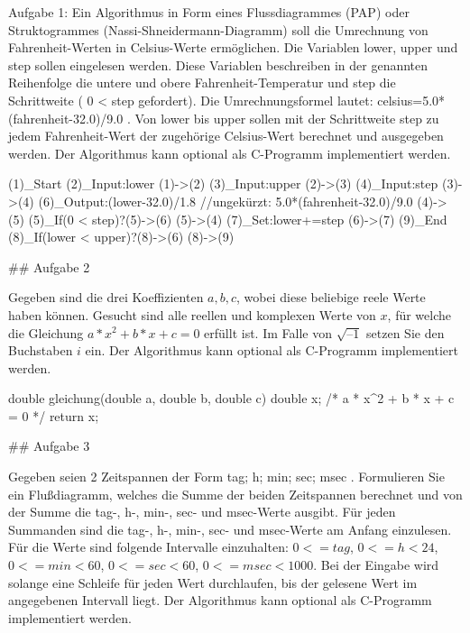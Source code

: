 Aufgabe 1: Ein Algorithmus in Form eines Flussdiagrammes (PAP) oder Struktogrammes (Nassi-Shneidermann-Diagramm) soll die Umrechnung von Fahrenheit-Werten in Celsius-Werte ermöglichen. Die Variablen lower, upper und step sollen eingelesen werden. Diese Variablen beschreiben in der genannten Reihenfolge die untere und obere Fahrenheit-Temperatur und step die Schrittweite ( 0 < step gefordert). Die Umrechnungsformel lautet: celsius=5.0*(fahrenheit-32.0)/9.0 .
Von lower bis upper sollen mit der Schrittweite step zu jedem Fahrenheit-Wert der zugehörige Celsius-Wert berechnet und ausgegeben werden. Der Algorithmus kann optional als C-Programm implementiert werden.

    (1)_Start
    (2)_Input:lower 
    (1)->(2)
    (3)_Input:upper
    (2)->(3)
    (4)_Input:step 
    (3)->(4)
    (6)_Output:(lower-32.0)/1.8  //ungekürzt: 5.0*(fahrenheit-32.0)/9.0
    (4)->(5)
    (5)_If(0 < step)?(5)->(6)
    (5)->(4)
    (7)_Set:lower+=step
    (6)->(7)
    (9)_End
    (8)_If(lower < upper)?(8)->(6)
    (8)->(9)

## Aufgabe 2

Gegeben sind die drei Koeffizienten $ a, b, c$, wobei diese beliebige reele Werte haben können. Gesucht sind alle reellen und komplexen Werte von $ x $, für welche die Gleichung $ a * x^2 + b * x + c = 0 $ erfüllt ist. Im Falle von $ \sqrt{–1} $ setzen Sie den Buchstaben $ i $ ein.
Der Algorithmus kann optional als C-Programm implementiert werden.

    double gleichung(double a, double b, double c){
      double x;
      /*
        a * x^2 + b * x + c = 0
      */
      return x;
    }

## Aufgabe 3

Gegeben seien 2 Zeitspannen der Form tag; h; min; sec; msec . Formulieren Sie ein Flußdiagramm, welches die Summe der beiden Zeitspannen berechnet und von der Summe die tag-, h-, min-, sec- und msec-Werte ausgibt. Für jeden Summanden sind die tag-, h-, min-, sec- und msec-Werte am Anfang einzulesen. Für die Werte sind folgende Intervalle einzuhalten: $ 0<=tag$, $ 0 <= h<24$, $ 0<= min < 60 $, $ 0<= sec < 60$, $ 0<= msec < 1000$. Bei der Eingabe wird solange eine Schleife für jeden Wert durchlaufen, bis der gelesene Wert im angegebenen Intervall liegt. Der Algorithmus kann optional als C-Programm implementiert werden.

